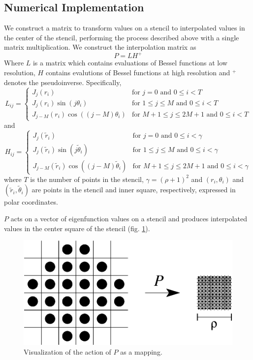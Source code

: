\documentclass{report}
\begin{document}
\subsection{Numerical Implementation}
We construct a matrix to transform values on a stencil to interpolated values in the center of the stencil, performing the process described above with a single matrix multiplication. We construct the interpolation matrix as
\[
P = L H^{+}
\]
Where $L$ is a matrix which contains evaluations of Bessel functions at low resolution, $H$ contains evalutions of Bessel functions at high resolution and $^{+}$ denotes the pseudoinverse. Specifically,
\[
L_{ij} =\begin{cases}
J_{j}(r_{i}) & \text{for } j = 0 \text{ and } 0 \le i < T\\
J_{j}(r_{i}) \sin{(j \theta_{i})} & \text{for } 1 \le j \le M \text{ and } 0 \le i < T\\
J_{j-M}(r_{i}) \cos{((j-M) \theta_{i})} & \text{for } M+1 \le j \le 2M+1 \text{ and } 0 \le i < T
\end{cases}
\]
and
\[
H_{ij} =\begin{cases}
J_{j}(\tilde{r}_{i}) & \text{for } j = 0 \text{ and } 0 \le i < \gamma\\
J_{j}(\tilde{r}_{i}) \sin{(j \tilde{\theta}_{i})} & \text{for } 1 \le j \le M \text{ and } 0 \le i < \gamma\\
J_{j-M}(\tilde{r}_{i}) \cos{((j-M) \tilde{\theta}_{i})} & \text{for } M+1 \le j \le 2M+1 \text{ and } 0 \le i < \gamma
\end{cases}
\]
where $T$ is the number of points in the stencil, $\gamma = (\rho + 1)^{2}$ and $(r_{i},\theta_{i})$ and $(\tilde{r}_{i},\tilde{\theta}_{i})$ are points in the stencil and inner square, respectively, expressed in polar coordinates.

$P$ acts on a vector of eigenfunction values on a stencil and produces interpolated values in the center square of the stencil (fig. \ref{fig:upsample_action}).

\begin{figure}
  \begin{center}
    \includegraphics[width=\textwidth]{figs/stencils/upsample_action.eps}
    \caption{Visualization of the action of $P$ as a mapping.}
    \label{fig:upsample_action}
  \end{center}
\end{figure}
\end{document}
